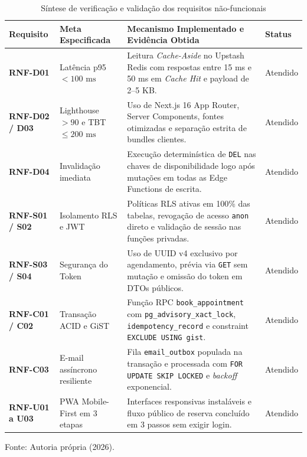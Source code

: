 \documentclass[12pt,a4paper]{article}
\begin{document}
\begin{table}[hbt]
\centering
\caption{Síntese de verificação e validação dos requisitos não-funcionais}
\label{quadro:validacao_rnf}
\footnotesize
\renewcommand{\arraystretch}{1.2}
\begin{tabularx}{\textwidth}{|l|p{3.5cm}|X|l|}
\hline
\textbf{Requisito} & \textbf{Meta Especificada} & \textbf{Mecanismo Implementado e Evidência Obtida} & \textbf{Status} \\ \hline
\textbf{RNF-D01} & Latência p95 $< 100\text{ ms}$ & Leitura \textit{Cache-Aside} no Upstash Redis com respostas entre 15 ms e 50 ms em \textit{Cache Hit} e payload de 2--5 KB. & Atendido \\ \hline
\textbf{RNF-D02 / D03} & Lighthouse $> 90$ e TBT $\le 200\text{ ms}$ & Uso de Next.js 16 App Router, Server Components, fontes otimizadas e separação estrita de bundles clientes. & Atendido \\ \hline
\textbf{RNF-D04} & Invalidação imediata & Execução determinística de \texttt{DEL} nas chaves de disponibilidade logo após mutações em todas as Edge Functions de escrita. & Atendido \\ \hline
\textbf{RNF-S01 / S02} & Isolamento RLS e JWT & Políticas RLS ativas em 100\% das tabelas, revogação de acesso \texttt{anon} direto e validação de sessão nas funções privadas. & Atendido \\ \hline
\textbf{RNF-S03 / S04} & Segurança do Token & Uso de UUID v4 exclusivo por agendamento, prévia via \texttt{GET} sem mutação e omissão do token em DTOs públicos. & Atendido \\ \hline
\textbf{RNF-C01 / C02} & Transação ACID e GiST & Função RPC \texttt{book\_appointment} com \texttt{pg\_advisory\_xact\_lock}, \texttt{idempotency\_record} e constraint \texttt{EXCLUDE USING gist}. & Atendido \\ \hline
\textbf{RNF-C03} & E-mail assíncrono resiliente & Fila \texttt{email\_outbox} populada na transação e processada com \texttt{FOR UPDATE SKIP LOCKED} e \textit{backoff} exponencial. & Atendido \\ \hline
\textbf{RNF-U01 a U03} & PWA Mobile-First em 3 etapas & Interfaces responsivas instaláveis e fluxo público de reserva concluído em 3 passos sem exigir login. & Atendido \\ \hline
\end{tabularx}
\vspace{0.1cm}
{\footnotesize Fonte: Autoria própria (2026).}
\end{table}
\end{document}

